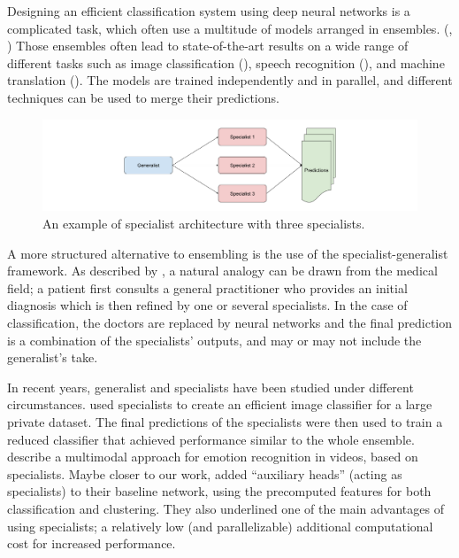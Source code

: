\documentclass[graybox]{styles/svmult}
\begin{document}
Designing an efficient classification system using deep neural networks
is a complicated task, which often use a multitude of models arranged in
ensembles. (\cite{galaxy}, \cite{vgg}) Those ensembles often lead to
state-of-the-art results on a wide range of different tasks such as
image classification (\cite{inception}), speech recognition
(\cite{deepspeech2}), and machine translation (\cite{seq2seq}). The
models are trained independently and in parallel, and different
techniques can be used to merge their predictions.

\begin{figure}[b]
\centering
\includegraphics[width=\textwidth]{./figs/specialists.png}
\caption{An example of specialist architecture with three specialists.}
\label{fig:1}
\end{figure}

A more structured alternative to ensembling is the use of the
specialist-generalist framework. As described by \cite{bochereau1990}, a
natural analogy can be drawn from the medical field; a patient first
consults a general practitioner who provides an initial diagnosis which
is then refined by one or several specialists. In the case of
classification, the doctors are replaced by neural networks and the
final prediction is a combination of the specialists' outputs, and may
or may not include the generalist's take.

In recent years, generalist and specialists have been studied under
different circumstances. \cite{darkknowledge} used specialists to create
an efficient image classifier for a large private dataset. The final
predictions of the specialists were then used to train a reduced
classifier that achieved performance similar to the whole ensemble.
\cite{emonets} describe a multimodal approach for emotion recognition in
videos, based on specialists. Maybe closer to our work,
\cite{wardefarley} added ``auxiliary heads'' (acting as specialists) to
their baseline network, using the precomputed features for both
classification and clustering. They also underlined one of the main
advantages of using specialists; a relatively low (and parallelizable)
additional computational cost for increased performance.
\end{document}
